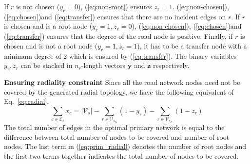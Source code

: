 \documentclass[sigconf]{acmart}
\begin{document}
If $r$ is not chosen ($y_r=0$), (\ref{eq:non-root}) ensures $z_r=1$. (\ref{eq:non-chosen}), (\ref{eq:chosen})and (\ref{eq:transfer}) ensures that there are no incident edges on $r$. If $r$ is chosen and is a root node ($y_r=1,z_r=0$), (\ref{eq:non-chosen}), (\ref{eq:chosen})and (\ref{eq:transfer}) ensures that the degree of the road node is positive. Finally, if $r$ is chosen and is not a root node ($y_r=1,z_r=1$), it has to be a transfer node with a minimum degree of $2$ which is ensured by (\ref{eq:transfer}). The binary variables $y_r,z_r$ can be stacked in $n_r$-length vectors $\mathbf{y}$ and $\mathbf{z}$ respectively.

\noindent\textbf{Ensuring radiality constraint}
Since all the road network nodes need not be covered by the generated radial topology, we have the following equivalent of Eq.~\ref{eq:radial}.
\begin{equation}
\sum_{e\in\mathcal{E}_s}x_e=|\mathcal{V}_s|-\sum_{r\in\mathcal{V}_{s_R}}(1-y_r)-\sum_{r\in\mathcal{V}_{s_R}}(1-z_r)\label{eq:prim_radial}
\end{equation}
The total number of edges in the optimal primary network is equal to the difference between total number of nodes to be covered and number of root nodes. The last term in (\ref{eq:prim_radial}) denotes the number of root nodes and the first two terms together indicates the total number of nodes to be covered.
\end{document}
